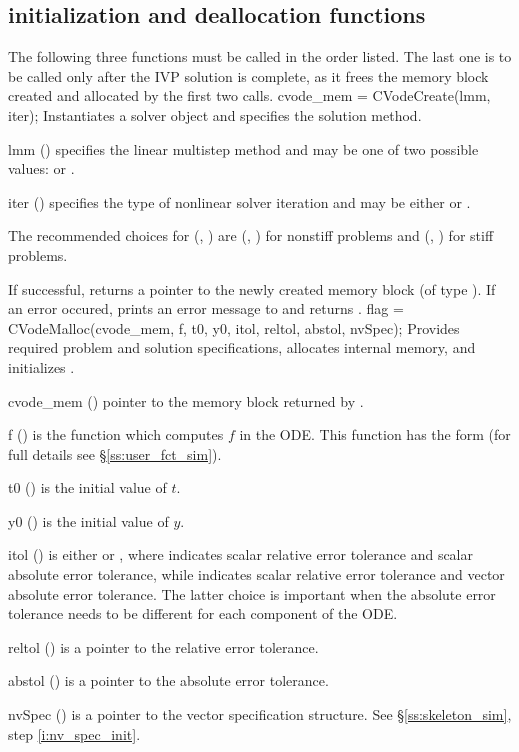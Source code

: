 \subsection{{\cvode} initialization and deallocation functions}
\label{sss:cvodemalloc}
The following three functions must be called in the order listed. The last one is to be 
called only after the IVP solution is complete, as it frees the {\cvode} memory block
created and allocated by the first two calls.
{
  cvode\_mem = CVodeCreate(lmm, iter);
}
{
  Instantiates a {\cvode} solver object and specifies the solution method.
}
{
  \begin{args}[iter]
  \item[lmm] ()
    specifies the linear multistep method and may be one of two
    possible values:  or .     
  \item[iter] ()
    specifies the type of nonlinear solver iteration and may be
    either  or . 
  \end{args}
  The recommended choices for (, ) are
  (, ) for nonstiff problems and
  (, ) for stiff problems.
}
{
  If successful,  returns a pointer to the newly created 
  {\cvode} memory block (of type ).
  If an error occured,  prints an error message to 
  and returns .
}
{}
{
flag = CVodeMalloc(cvode\_mem, f, t0, y0, itol, reltol, abstol, nvSpec);
}
{
  Provides required problem and solution specifications, allocates internal memory,
  and initializes {\cvode}.
}
{
  \begin{args}[abstol]
  \item[cvode\_mem] ()
    pointer to the {\cvode} memory block returned by .
  \item[f] ()
    is the {\C} function which computes $f$ in the ODE. This function has the form 
     (for full details see \S\ref{ss:user_fct_sim}).
  \item[t0] ()
    is the initial value of $t$.
  \item[y0] ()
    is the initial value of $y$. 
  \item[itol] () 
    is either  or , where  indicates scalar relative error 
    tolerance and scalar absolute error tolerance, while  indicates scalar
    relative error tolerance and vector absolute error tolerance. 
    The latter choice is important when the absolute error tolerance needs to
    be different for each component of the ODE. 
  \item[reltol] ()
    is a pointer to the relative error tolerance.
  \item[abstol] ()
    is a pointer to the absolute error tolerance.
  \item[nvSpec] ()
    is a pointer to the vector specification structure. See \S\ref{ss:skeleton_sim}, 
    step \ref{i:nv_spec_init}.
  \end{args}
}
